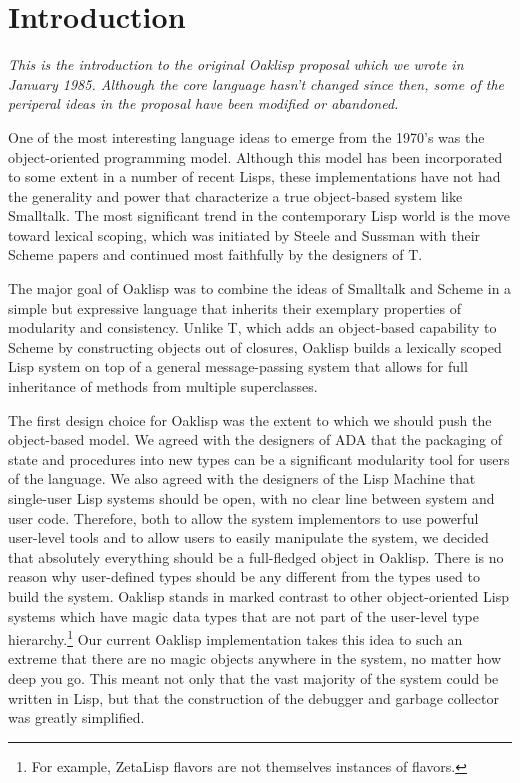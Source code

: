\chapter{Introduction}

{\em This is the introduction to the original Oaklisp proposal which
we wrote in January 1985.  Although the core language hasn't changed
since then, some of the periperal ideas in the proposal have been
modified or abandoned.}

One of the most interesting language ideas to emerge from the 1970's
was the object-oriented programming model.  Although this model has
been incorporated to some extent in a number of recent Lisps, these
implementations have not had the generality and power that
characterize a true object-based system like Smalltalk.  The most
significant trend in the contemporary Lisp world is the move toward
lexical scoping, which was initiated by Steele and Sussman with their
Scheme papers and continued most faithfully by the designers of T.

The major goal of Oaklisp was to combine the ideas of Smalltalk and
Scheme in a simple but expressive language that inherits their
exemplary properties of modularity and consistency.  Unlike T, which
adds an object-based capability to Scheme by constructing objects out
of closures, Oaklisp builds a lexically scoped Lisp system on top of a
general message-passing system that allows for full inheritance of
methods from multiple superclasses.

The first design choice for Oaklisp was the extent to which we should
push the object-based model.  We agreed with the designers of ADA that
the packaging of state and procedures into new types can be a
significant modularity tool for users of the language.  We also agreed
with the designers of the Lisp Machine that single-user Lisp systems
should be open, with no clear line between system and user code.
Therefore, both to allow the system implementors to use powerful
user-level tools and to allow users to easily manipulate the system,
we decided that absolutely everything should be a full-fledged object
in Oaklisp.  There is no reason why user-defined types should be any
different from the types used to build the system.  Oaklisp stands in
marked contrast to other object-oriented Lisp systems which have magic
data types that are not part of the user-level type
hierarchy.\footnote{For example, ZetaLisp flavors are not themselves
instances of flavors.} Our current Oaklisp implementation takes this
idea to such an extreme that there are no magic objects anywhere in
the system, no matter how deep you go.  This meant not only that the
vast majority of the system could be written in Lisp, but that the
construction of the debugger and garbage collector was greatly
simplified.

